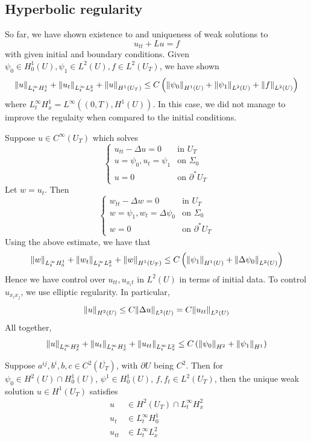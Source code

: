 \documentclass{article}
\begin{document}
\subsection{Hyperbolic regularity}

So far, we have shown existence to and uniqueness of weak solutions to
\[u_{tt} + Lu = f\]
with given initial and boundary conditions. Given \(\psi_0 \in H^1_0(U), \psi_1 \in L^2(U), f \in L^2(U_T)\), we have shown
\[\norm{u}_{L^\infty_tH^1_x} + \norm{u_t}_{L^\infty_tL^2_x} + \norm{u}_{H^1(U_T)} \le C\left(\norm{\psi_0}_{H^1(U)} + \norm{\psi_1}_{L^2(U)} + \norm{f}_{L^2(U)}\right)\]
where \(L^\infty_tH^1_x = L^\infty((0, T), H^1(U))\). In this case, we did not manage to improve the regulaity when compared to the initial conditions.

\begin{example}
    Suppose \(u \in C^\infty(U_T)\) which solves
    \[\begin{cases}
        u_{tt} - \Delta u = 0 &\text{in }U_T \\
        u = \psi_0, u_t = \psi_1 &\text{on }\Sigma_0 \\
        u = 0&\text{on }\partial^* U_T
    \end{cases}\]
    Let \(w = u_t\). Then
    \[\begin{cases}
        w_{tt} - \Delta w = 0 &\text{in }U_T \\
        w = \psi_1, w_t = \Delta\psi_0 &\text{on }\Sigma_0 \\
        w = 0 &\text{on }\partial^*U_T
    \end{cases}\]
    Using the above estimate, we have that
    \[\norm{w}_{L^\infty_t H^1_0} + \norm{w_t}_{L^\infty_tL^2_x} + \norm{w}_{H^1(U_T)} \le C\left(\norm{\psi_1}_{H^1(U)} + \norm{\Delta \psi_0}_{L^2(U)}\right)\]
    Hence we have control over \(u_{tt}, u_{x_it}\) in \(L^2(U)\) in terms of initial data. To control \(u_{x_ix_j}\), we use elliptic regularity. In particular,
    \[\norm{u}_{H^2(U)} \le C\norm{\Delta u}_{L^2(U)} = C\norm{u_{tt}}_{L^2(U)}\]
    All together,
    \[\norm{u}_{L^\infty_tH^2_x} + \norm{u_t}_{L^\infty_tH^1_x} + \norm{u_{tt}}_{L^\infty_tL^2_x} \le C\left(\norm{\psi_0}_{H^2} + \norm{\psi_1}_{H^1}\right)\]
\end{example}

\begin{theorem}
      Suppose \(a^{ij}, b^i, b, c \in C^2(\overline{U_T})\), with \(\partial U\) being \(C^2\). Then for \(\psi_0 \in H^2(U) \cap H^1_0(U)\), \(\psi^1 \in H^1_0(U)\), \(f, f_t \in L^2(U_T)\), then the unique weak solution \(u \in H^1(U_T)\) satisfies
    \begin{align*}
        u &\in H^2(U_T) \cap L^\infty_tH^2_x \\
        u_t &\in L^\infty_tH^1_0 \\
        u_{tt} &\in L^\infty_tL^2_x
    \end{align*}
\end{theorem}
\end{document}
